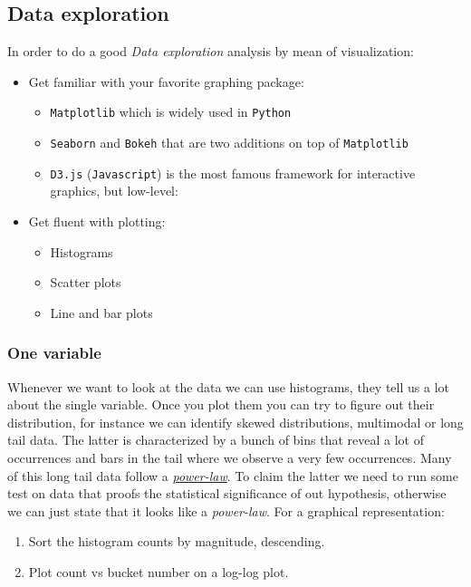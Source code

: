 \subsection{Data exploration}

In order to do a good \emph{Data exploration} analysis by mean of visualization:

\begin{itemize}
\item {Get familiar with your favorite graphing package:}
\begin{itemize}
\item \texttt{Matplotlib} which is widely used in \texttt{Python}
\item \texttt{Seaborn} and \texttt{Bokeh} that are two additions on top of \texttt{Matplotlib}
\item \texttt{D3.js} (\texttt{Javascript}) is the most famous framework for interactive graphics, but low-level:
\end{itemize}
\item {Get fluent with plotting:}
\begin{itemize}
\item Histograms
\item Scatter plots
\item Line and bar plots
\end{itemize}
\end{itemize} 

\subsubsection{One variable}

Whenever we want to look at the data we can use histograms, they tell us a lot about the single variable. Once you plot them you can try to figure out their distribution, for instance we can identify skewed distributions, multimodal or long tail data. The latter is characterized by a bunch of bins that reveal a lot of occurrences and bars in the tail where we observe a very few occurrences. Many of this long tail data follow a \href{https://en.wikipedia.org/wiki/Power\_law\#Power-law\_probability\_distributions}{\emph{power-law}}. To claim the latter we need to run some test on data that proofs the statistical significance of out hypothesis, otherwise we can just state that it looks like a \emph{power-law}. For a graphical representation:

\begin{enumerate}
\item Sort the histogram counts by magnitude, descending.
\item Plot count vs bucket number on a log-log plot.
\end{enumerate}

